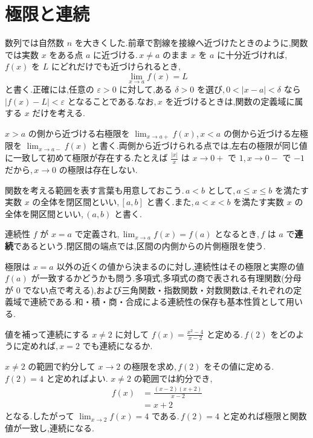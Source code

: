 \section{極限と連続}\label{節:関数極限連続}
数列では自然数 $n$ を大きくした.前章で割線を接線へ近づけたときのように,関数では実数 $x$ をある点 $a$ に近づける.\,$x\ne a$ のまま $x$ を $a$ に十分近づければ,\,$f(x)$ を $L$ にどれだけでも近づけられるとき,
\[
 \lim_{x\to a}f(x)=L
\]
と書く.正確には,任意の $\varepsilon>0$ に対して,ある $\delta>0$ を選び,\,$0<|x-a|<\delta$ なら $|f(x)-L|<\varepsilon$ となることである.なお,\,$x$ を近づけるときは,関数の定義域に属する $x$ だけを考える.

$x>a$ の側から近づける右極限を $\lim_{x\to a+}f(x)$,\,$x<a$ の側から近づける左極限を $\lim_{x\to a-}f(x)$ と書く.両側から近づけられる点では,左右の極限が同じ値に一致して初めて極限が存在する.たとえば $\frac{|x|}{x}$ は $x\to0+$ で $1$,\,$x\to0-$ で $-1$ だから,\,$x\to0$ の極限は存在しない.

関数を考える範囲を表す言葉も用意しておこう.\,$a<b$ として,\,$a\le x\le b$ を満たす実数 $x$ の全体を閉区間といい,\,$[a,b]$ と書く.また,\,$a<x<b$ を満たす実数 $x$ の全体を開区間といい,\,$(a,b)$ と書く.

\begin{definition}{連続性}
$f$ が $x=a$ で定義され,\,$\lim_{x\to a}f(x)=f(a)$ となるとき,\,$f$ は $a$ で\textbf{連続}であるという.閉区間の端点では,区間の内側からの片側極限を使う.
\end{definition}

極限は $x=a$ 以外の近くの値から決まるのに対し,連続性はその極限と実際の値 $f(a)$ が一致するかどうかも問う.多項式,多項式の商で表される有理関数(分母が $0$ でない点で考える),および三角関数・指数関数・対数関数は,それぞれの定義域で連続である.和・積・商・合成による連続性の保存も基本性質として用いる.

\begin{example}{値を補って連続にする}
$x\ne2$ に対して $f(x)=\frac{x^2-4}{x-2}$ と定める.\,$f(2)$ をどのように定めれば,\,$x=2$ でも連続になるか.
\end{example}
$x\ne2$ の範囲で約分して $x\to2$ の極限を求め,\,$f(2)$ をその値に定める.
$f(2)=4$ と定めればよい.
$x\ne2$ の範囲では約分でき,
\begin{align*}
 f(x)&=\frac{(x-2)(x+2)}{x-2}\\
 &=x+2
\end{align*}
となる.したがって $\lim_{x\to2}f(x)=4$ である.\,$f(2)=4$ と定めれば極限と関数値が一致し,連続になる.


